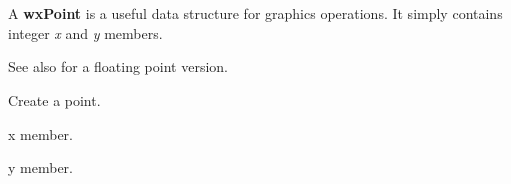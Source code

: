 \section{}\label{wxpoint}

A {\bf wxPoint} is a useful data structure for graphics operations.
It simply contains integer {\it x} and {\it y} members.

See also  for a floating point version.









Create a point.



x member.



y member.

